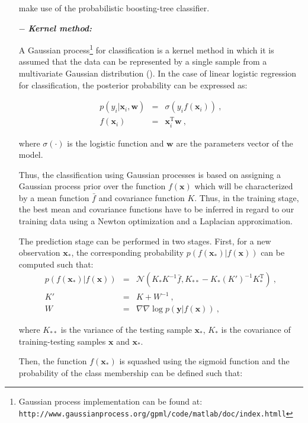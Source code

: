 \begin{enumerate}[leftmargin=*]
\cite{Tiwari2009a,Tiwari2012,Tiwari2010,Viswanath2011} make use of the probabilistic boosting-tree classifier.

\item[$-$] \textbf{\textit{Kernel method:}}

A Gaussian process\footnote{Gaussian process implementation can be found at: \texttt{http://www.gaussianprocess.org/gpml/\allowbreak code/matlab/doc/index.htmll}} for classification is a kernel method in which it is assumed that the data can be represented by a single sample from a multivariate Gaussian distribution (\cite{Rasmussen2005}). In the case of linear logistic regression for classification, the posterior probability can be expressed as:

\begin{eqnarray}
	p(y_i|\mathbf{x}_i,\mathbf{w}) & = & \sigma(y_i f(\mathbf{x}_i)) \ , \label{eq:gp1} \\
	f(\mathbf{x}_i) & = & \mathbf{x}_i^{\text{T}} \mathbf{w} \ , \nonumber
\end{eqnarray}

\noindent where $\sigma(\cdot)$ is the logistic function and $\mathbf{w}$ are the parameters vector of the model.

Thus, the classification using Gaussian processes is based on assigning a Gaussian process prior over the function $f(\mathbf{x})$ which will be characterized by a mean function $\bar{f}$ and covariance function $K$. Thus, in the training stage, the best mean and covariance functions have to be inferred in regard to our training data using a Newton optimization and a Laplacian approximation.

The prediction stage can be performed in two stages. First, for a new observation $\mathbf{x}_*$, the corresponding probability $p(f(\mathbf{x}_*)|f(\mathbf{x}))$ can be computed such that:
\begin{eqnarray}
	p(f(\mathbf{x}_*)|f(\mathbf{x})) & = & \mathcal{N}( K_*K^{-1}\bar{f}, K_{**}-K_*(K')^{-1}K_*^{\text{T}} ) \ , \nonumber \\
	K' & = & K + W^{-1} \ , \label{eq:gp2} \\
	W & = & \nabla \nabla \log p(\mathbf{y}|f(\mathbf{x})) \ , \nonumber
\end{eqnarray}

\noindent where $K_{**}$ is the variance of the testing sample $\mathbf{x}_*$, $K_{*}$ is the covariance of training-testing samples $\mathbf{x}$ and $\mathbf{x}_*$.

Then, the function $f(\mathbf{x}_*)$ is squashed using the sigmoid function and the probability of the class membership can be defined such that:


\end{enumerate}
